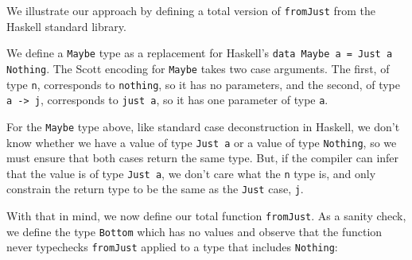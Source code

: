 \documentclass[]{article}
\newenvironment{Shaded}{}{}
\newcommand{\KeywordTok}[1]{\textcolor[rgb]{0.00,0.44,0.13}{\textbf{{#1}}}}
\newcommand{\DataTypeTok}[1]{\textcolor[rgb]{0.56,0.13,0.00}{{#1}}}
\newcommand{\OtherTok}[1]{\textcolor[rgb]{0.00,0.44,0.13}{{#1}}}
\newcommand{\FunctionTok}[1]{\textcolor[rgb]{0.02,0.16,0.49}{{#1}}}
\newcommand{\NormalTok}[1]{{#1}}
\begin{document}
We illustrate our approach by defining a total version of
\texttt{fromJust} from the Haskell standard library.

We define a \texttt{Maybe} type as a replacement for Haskell's
\texttt{data Maybe a = Just a \textbar{} Nothing}. The Scott encoding
for \texttt{Maybe} takes two case arguments. The first, of type
\texttt{n}, corresponds to \texttt{nothing}, so it has no parameters,
and the second, of type \texttt{a -\textgreater{} j}, corresponds to
\texttt{just a}, so it has one parameter of type \texttt{a}.

\begin{Shaded}
\end{Shaded}

For the \texttt{Maybe} type above, like standard case deconstruction in
Haskell, we don't know whether we have a value of type \texttt{Just a}
or a value of type \texttt{Nothing}, so we must ensure that both cases
return the same type. But, if the compiler can infer that the value is
of type \texttt{Just a}, we don't care what the \texttt{n} type is, and
only constrain the return type to be the same as the \texttt{Just} case,
\texttt{j}.

With that in mind, we now define our total function \texttt{fromJust}.
As a sanity check, we define the type \texttt{Bottom} which has no
values and observe that the function never typechecks \texttt{fromJust}
applied to a type that includes \texttt{Nothing}:
\end{document}

